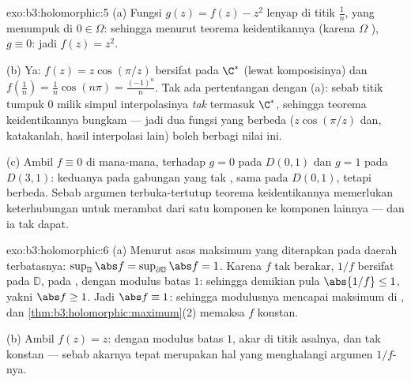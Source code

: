 \begin{solution}{exo:b3:holomorphic:5}
(a) Fungsi $g(z) = f(z) - z^2$ lenyap di titik $\frac1n$,
yang menumpuk di $0 \in \Omega$: sehingga menurut teorema keidentikannya
(karena $\Omega$ ), $g \equiv 0$: jadi $f(z) = z^2$.

(b) Ya: $f(z) = z\cos(\pi/z)$ bersifat  pada $\C^*$
(lewat komposisinya) dan $f(\frac1n) = \frac1n\cos(n\pi) =
\frac{(-1)^n}n$. Tak ada pertentangan dengan (a): sebab titik tumpuk
$0$ milik simpul interpolasinya \emph{tak} termasuk
$\C^*$, sehingga teorema keidentikannya bungkam --- jadi dua fungsi
yang berbeda ($z\cos(\pi/z)$ dan, katakanlah, hasil interpolasi
lain) boleh berbagi nilai ini.

(c) Ambil $f \equiv 0$ di mana-mana, terhadap $g = 0$ pada $D(0,1)$ dan
$g = 1$ pada $D(3,1)$: keduanya  pada gabungan yang tak ,
sama pada $D(0,1)$, tetapi berbeda. Sebab argumen terbuka-tertutup
teorema keidentikannya memerlukan keterhubungan untuk merambat dari satu
komponen ke komponen lainnya --- dan ia tak dapat.
\end{solution}

\begin{solution}{exo:b3:holomorphic:6}
(a) Menurut asas maksimum yang diterapkan pada daerah terbatasnya:
$\sup_{\mathbb D}\abs f = \sup_{\partial\mathbb D}\abs f = 1$.
Karena $f$ tak berakar, $1/f$ bersifat  pada $\mathbb D$,
 pada , dengan modulus batas $1$: sehingga demikian pula
$\abs{1/f} \leq 1$, yakni $\abs f \geq 1$. Jadi $\abs f \equiv
1$: sehingga modulusnya mencapai maksimum di , dan
\cref{thm:b3:holomorphic:maximum}(2) memaksa $f$ konstan.

(b) Ambil $f(z) = z$: dengan modulus batas $1$, akar di titik asalnya, dan
tak konstan --- sebab akarnya tepat merupakan hal yang menghalangi argumen
$1/f$-nya.
\end{solution}


